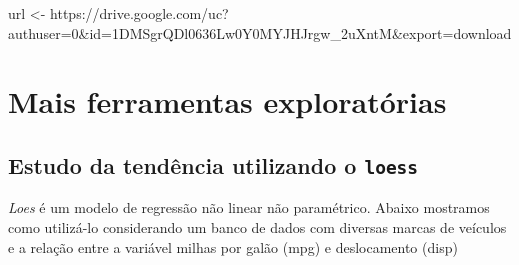 \documentclass[
  letterpaper,
  DIV=11,
  numbers=noendperiod]{scrreprt}
\newenvironment{Shaded}{\begin{snugshade}}{\end{snugshade}}
\newcommand{\AttributeTok}[1]{\textcolor[rgb]{0.40,0.45,0.13}{#1}}
\newcommand{\DecValTok}[1]{\textcolor[rgb]{0.68,0.00,0.00}{#1}}
\newcommand{\FunctionTok}[1]{\textcolor[rgb]{0.28,0.35,0.67}{#1}}
\newcommand{\NormalTok}[1]{\textcolor[rgb]{0.00,0.23,0.31}{#1}}
\newcommand{\OtherTok}[1]{\textcolor[rgb]{0.00,0.23,0.31}{#1}}
\newcommand{\SpecialCharTok}[1]{\textcolor[rgb]{0.37,0.37,0.37}{#1}}
\newcommand{\StringTok}[1]{\textcolor[rgb]{0.13,0.47,0.30}{#1}}
\begin{document}
\begin{Shaded}
\begin{Highlighting}[]
\NormalTok{url }\OtherTok{\textless{}{-}} \StringTok{\textquotesingle{}https://drive.google.com/uc?authuser=0\&id=1DMSgrQDl0636Lw0Y0MYJHJrgw\_2uXntM\&export=download\textquotesingle{}}
\end{Highlighting}
\end{Shaded}


\hypertarget{mais-ferramentas-exploratuxf3rias}{%
\chapter{Mais ferramentas
exploratórias}\label{mais-ferramentas-exploratuxf3rias}}

\hypertarget{estudo-da-tenduxeancia-utilizando-o-loess}{%
\section{\texorpdfstring{Estudo da tendência utilizando o
\texttt{loess}}{Estudo da tendência utilizando o loess}}\label{estudo-da-tenduxeancia-utilizando-o-loess}}

\emph{Loes} é um modelo de regressão não linear não paramétrico. Abaixo
mostramos como utilizá-lo considerando um banco de dados com diversas
marcas de veículos e a relação entre a variável milhas por galão (mpg) e
deslocamento (disp)

\begin{Shaded}
\end{Shaded}
\end{document}
